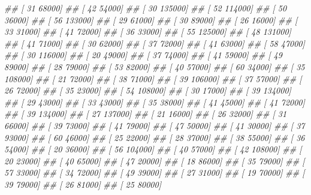 \documentclass[
]{book}
\newenvironment{Shaded}{\begin{snugshade}}{\end{snugshade}}
\newcommand{\CommentTok}[1]{\textcolor[rgb]{0.56,0.35,0.01}{\textit{#1}}}
\theoremstyle{definition}
\theoremstyle{definition}
\theoremstyle{definition}
\theoremstyle{definition}
\theoremstyle{remark}
\begin{document}
\begin{Shaded}
\begin{Highlighting}[]
\CommentTok{\#\#  [    31  68000]}
\CommentTok{\#\#  [    42  54000]}
\CommentTok{\#\#  [    30 135000]}
\CommentTok{\#\#  [    52 114000]}
\CommentTok{\#\#  [    50  36000]}
\CommentTok{\#\#  [    56 133000]}
\CommentTok{\#\#  [    29  61000]}
\CommentTok{\#\#  [    30  89000]}
\CommentTok{\#\#  [    26  16000]}
\CommentTok{\#\#  [    33  31000]}
\CommentTok{\#\#  [    41  72000]}
\CommentTok{\#\#  [    36  33000]}
\CommentTok{\#\#  [    55 125000]}
\CommentTok{\#\#  [    48 131000]}
\CommentTok{\#\#  [    41  71000]}
\CommentTok{\#\#  [    30  62000]}
\CommentTok{\#\#  [    37  72000]}
\CommentTok{\#\#  [    41  63000]}
\CommentTok{\#\#  [    58  47000]}
\CommentTok{\#\#  [    30 116000]}
\CommentTok{\#\#  [    20  49000]}
\CommentTok{\#\#  [    37  74000]}
\CommentTok{\#\#  [    41  59000]}
\CommentTok{\#\#  [    49  89000]}
\CommentTok{\#\#  [    28  79000]}
\CommentTok{\#\#  [    53  82000]}
\CommentTok{\#\#  [    40  57000]}
\CommentTok{\#\#  [    60  34000]}
\CommentTok{\#\#  [    35 108000]}
\CommentTok{\#\#  [    21  72000]}
\CommentTok{\#\#  [    38  71000]}
\CommentTok{\#\#  [    39 106000]}
\CommentTok{\#\#  [    37  57000]}
\CommentTok{\#\#  [    26  72000]}
\CommentTok{\#\#  [    35  23000]}
\CommentTok{\#\#  [    54 108000]}
\CommentTok{\#\#  [    30  17000]}
\CommentTok{\#\#  [    39 134000]}
\CommentTok{\#\#  [    29  43000]}
\CommentTok{\#\#  [    33  43000]}
\CommentTok{\#\#  [    35  38000]}
\CommentTok{\#\#  [    41  45000]}
\CommentTok{\#\#  [    41  72000]}
\CommentTok{\#\#  [    39 134000]}
\CommentTok{\#\#  [    27 137000]}
\CommentTok{\#\#  [    21  16000]}
\CommentTok{\#\#  [    26  32000]}
\CommentTok{\#\#  [    31  66000]}
\CommentTok{\#\#  [    39  73000]}
\CommentTok{\#\#  [    41  79000]}
\CommentTok{\#\#  [    47  50000]}
\CommentTok{\#\#  [    41  30000]}
\CommentTok{\#\#  [    37  93000]}
\CommentTok{\#\#  [    60  46000]}
\CommentTok{\#\#  [    25  22000]}
\CommentTok{\#\#  [    28  37000]}
\CommentTok{\#\#  [    38  55000]}
\CommentTok{\#\#  [    36  54000]}
\CommentTok{\#\#  [    20  36000]}
\CommentTok{\#\#  [    56 104000]}
\CommentTok{\#\#  [    40  57000]}
\CommentTok{\#\#  [    42 108000]}
\CommentTok{\#\#  [    20  23000]}
\CommentTok{\#\#  [    40  65000]}
\CommentTok{\#\#  [    47  20000]}
\CommentTok{\#\#  [    18  86000]}
\CommentTok{\#\#  [    35  79000]}
\CommentTok{\#\#  [    57  33000]}
\CommentTok{\#\#  [    34  72000]}
\CommentTok{\#\#  [    49  39000]}
\CommentTok{\#\#  [    27  31000]}
\CommentTok{\#\#  [    19  70000]}
\CommentTok{\#\#  [    39  79000]}
\CommentTok{\#\#  [    26  81000]}
\CommentTok{\#\#  [    25  80000]}

\end{Highlighting}
\end{Shaded}
\end{document}
